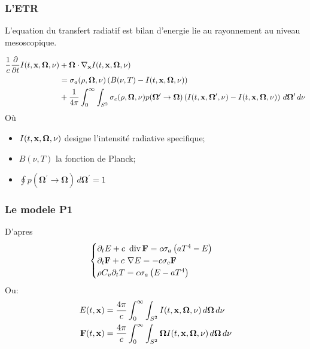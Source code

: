 \begin{frame}
  \frametitle{L'ETR}
  L'equation du transfert radiatif est bilan d'energie lie au rayonnement au niveau mesoscopique. 

  \begingroup
  \scriptsize
  \begin{gather*}
      \begin{aligned}
      \frac{1}{c} \frac{\partial}{\partial t}I(t,\mathbf{x},\bm{\Omega},\nu) &+\bm{\Omega}\cdot\nabla_{\mathbf{x}} I(t,\mathbf{x},\bm{\Omega},\nu) \\
      &= \sigma_a(\rho,\bm{\Omega},\nu)\left(B(\nu,T)-I(t,\mathbf{x},\bm{\Omega},\nu)\right) \\
      &+ \frac{1}{4\pi} \int_{0}^{\infty} \int_{S^2}\sigma_c(\rho,\bm{\Omega},\nu)p(\bm{\Omega}^\prime\rightarrow\bm{\Omega})\left(I(t,\mathbf{x},\bm{\Omega}^\prime,\nu)-I(t,\mathbf{x},\bm{\Omega},\nu)\right) \, d\bm{\Omega}^\prime \, d\nu
      \end{aligned}
  \end{gather*}
  \endgroup
Où 
\begin{itemize}
  \item $I(t,\mathbf{x},\bm{\Omega},\nu)$ designe l'intensité radiative specifique;
  \item $B(\nu,T)$ la fonction de Planck;
  \item $\oint p(\bm{\Omega}^\prime\rightarrow\bm{\Omega})\, d\bm{\Omega}^\prime=1$
\end{itemize}

\end{frame}

\begin{frame}
  \frametitle{Le modele P1}
  D'apres \parencite{Reference2}
  \begingroup
  \large
  \begin{equation*}
      \begin{cases}
       \partial_tE + c \ \operatorname {div} \mathbf{F} = c\sigma_a\left(aT^4-E\right)\\
       \partial_t\mathbf{F} + c \ \nabla E = -c\sigma_c \mathbf{F} \\
       \rho C_v \partial_t T = c \sigma_a \left(E-aT^4\right)
      \end{cases}
  \end{equation*}
  \endgroup
Ou:   %
\begin{align*}
  E(t,\mathbf{x}) &= \frac{4\pi}{c} \int_{0}^{\infty} \int_{S^2} I(t,\mathbf{x},\bm{\Omega},\nu) \, d\bm{\Omega} \, d\nu \\
  \mathbf{F}(t,\mathbf{x}) &= \frac{4\pi}{c} \int_{0}^{\infty} \int_{S^2} \bm{\Omega}I(t,\mathbf{x},\bm{\Omega},\nu) \, d\bm{\Omega} \, d\nu 
\end{align*}

\end{frame}

